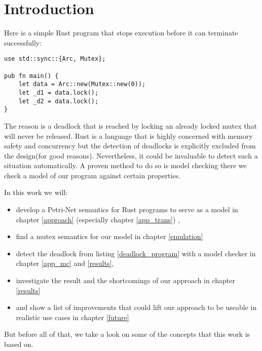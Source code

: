 \chapter{Introduction}
\label{introduction}

Here is a simple Rust\cite{klabnik2018rust} program that stops execution before it can terminate successfully:

\begin{lstlisting}
use std::sync::{Arc, Mutex};

pub fn main() {
    let data = Arc::new(Mutex::new(0));
    let _d1 = data.lock();
    let _d2 = data.lock();
}
\end{lstlisting}
The reason is a deadlock that is reached by locking an already locked mutex that will never be released.
Rust is a language that is highly concerned with memory safety and concurrency\cite{Matsakis:2014:RL:2692956.2663188} but the detection of deadlocks is explicitly excluded from the design\cite[Chapter 8.1]{nomicon}(for good reasons).
Nevertheless, it could be invaluable to detect such a situation automatically.
A proven method to do so is model checking\cite{baier2008principles} there we check a model of our program against certain properties.

In this work we will:
\begin{itemize}
    \item develop a Petri-Net\cite{petri1962kommunikation} semantics for Rust programs to serve as a model in chapter \ref{approach} (especially chapter \ref{app_trans}) ,
    \item find a mutex semantics for our model in chapter \ref{emulation}
    \item detect the deadlock from listing \ref{deadlock_program} with a model checker in chapter \ref{app_mc} and \ref{results},
    \item investigate the result and the shortcomings of our approach in chapter \ref{results}
    \item and show a list of improvements that could lift our approach to be useable in realistic use cases in chapter \ref{future}
\end{itemize}
But before all of that, we take a look on some of the concepts that this work is based on.